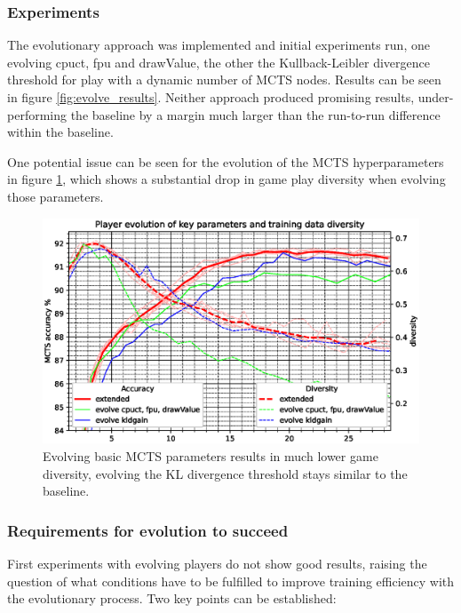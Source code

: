 \documentclass[12pt,onecolumn,oneside,titlepage]{article}
\begin{document}
\subsubsection{Experiments}

The evolutionary approach was implemented and initial experiments run, one evolving cpuct, fpu and drawValue, the other the Kullback-Leibler divergence threshold for play with a dynamic number of MCTS nodes.
Results can be seen in figure \ref{fig:evolve_results}. Neither approach produced promising results, under-performing the baseline by a margin much larger than the run-to-run difference within the baseline.


One potential issue can be seen for the evolution of the MCTS hyperparameters in figure \ref{fig:evolve_low_diversity}, which shows a substantial drop in game play diversity when evolving those parameters.

\begin{figure}[H]
\centering
\includegraphics[clip,width=\columnwidth]{evolve_low_diversity}
\caption{Evolving basic MCTS parameters results in much lower game diversity, evolving the KL divergence threshold stays similar to the baseline. }
\label{fig:evolve_low_diversity}
\end{figure}

\subsubsection{Requirements for evolution to succeed}

First experiments with evolving players do not show good results, raising the question of what conditions have to be fulfilled to improve training efficiency with the evolutionary process.
Two key points can be established:
\end{document}
